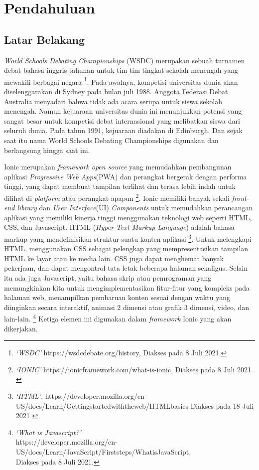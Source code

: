 \chapter{Pendahuluan}
\label{chap:intro}
   
\section{Latar Belakang}
\label{sec:label}

\textit{World Schools Debating Championships} (WSDC) merupakan sebuah turnamen debat bahasa inggris tahunan untuk tim-tim tingkat sekolah menengah yang mewakili berbagai negara \footnote{\textit{`WSDC'} https://wsdcdebate.org/history, Diakses pada 8 Juli 2021.}. Pada awalnya, kompetisi universitas dunia akan diselenggarakan di Sydney pada bulan juli 1988. Anggota Federasi Debat Australia menyadari bahwa tidak ada acara serupa untuk siswa sekolah menengah. Namun kejuaraan universitas dunia ini menunjukkan potensi yang sangat besar untuk kompetisi debat internasional yang melibatkan siswa dari seluruh dunia. Pada tahun 1991, kejuaraan diadakan di Edinburgh. Dan sejak saat itu nama World Schools Debating Championships digunakan dan berlangsung hingga saat ini. 

Ionic merupakan \textit{framework open source} yang memudahkan pembangunan aplikasi \textit{Progressive Web Apps}(PWA) dan perangkat bergerak dengan performa tinggi, yang dapat membuat tampilan terlihat dan terasa lebih indah untuk dilihat di \textit{platform} atau perangkat apapun \footnote{\textit{`IONIC'} https://ionicframework.com/what-is-ionic, Diakses pada 8 Juli 2021. \label{ref:ionicwebsite}}. Ionic memiliki banyak sekali \textit{front-end library} dan \textit{User Interface}(UI) {\it Components} untuk memudahkan perancangan aplikasi yang memiliki kinerja tinggi menggunakan teknologi web seperti HTML, CSS, dan Javascript. HTML (\textit{Hyper Text Markup Language}) adalah bahasa markup yang mendefinisikan struktur suatu konten aplikasi \footnote{\textit{`HTML'}, https://developer.mozilla.org/en-US/docs/Learn/Getting\textunderscore started\textunderscore with\textunderscore the\textunderscore web/HTML\textunderscore basics Diakses pada 18 Juli 2021 \label{ref:htmldefinition}}. Untuk melengkapi HTML, menggunakan CSS sebagai pelengkap yang mempresentasikan tampilan HTML ke layar atau ke media lain. CSS juga dapat menghemat banyak pekerjaan, dan dapat mengontrol tata letak beberapa halaman sekaligus. Selain itu ada juga Javascript, yaitu bahasa skrip atau pemrograman yang memungkinkan kita untuk mengimplementasikan fitur-fitur yang kompleks pada halaman web, menampilkan pembaruan konten sesuai dengan waktu yang diinginkan secara interaktif, animasi 2 dimensi atau grafik 3 dimensi, video, dan lain-lain. \footnote{\textit{`What is Javascript?'} \\ https://developer.mozilla.org/en-US/docs/Learn/JavaScript/First\textunderscore steps/What\textunderscore is\textunderscore JavaScript, \\ Diakses pada 8 Juli 2021.} Ketiga elemen ini digunakan dalam \textit{framework} Ionic yang akan dikerjakan.

